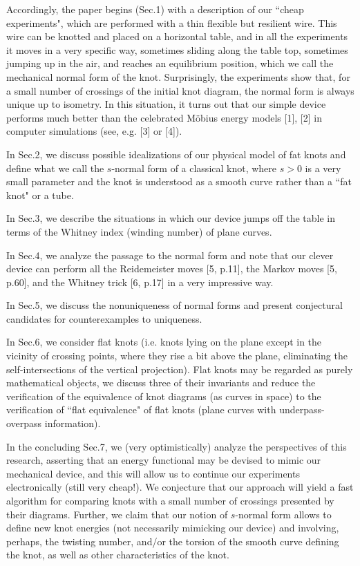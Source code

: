 \documentclass[12pt]{book}
\begin{document}
Accordingly, the paper begins (Sec.1) with a description of our ``cheap experiments", which are performed with a thin flexible but resilient wire. This wire can be knotted and placed on a horizontal table, and in all the experiments  it moves in a very specific way, sometimes sliding along the table top, sometimes jumping up in the air, and reaches an equilibrium position, which we call the mechanical normal form of the knot. Surprisingly, the experiments show that, for a small number of crossings of the initial knot diagram, the normal form is always unique up to isometry. In this situation, it turns out that our simple device performs much better than the celebrated M\"obius energy models [1], [2] in computer simulations (see, e.g. [3] or [4]).

In Sec.2, we discuss possible idealizations of our physical model of fat knots and define 
what we call the $s$-normal form of a classical knot, where $s>0$ is a very small parameter and the knot is understood as a smooth curve 
rather than a ``fat knot" or a tube. 

In Sec.3, we describe the situations in which our device jumps off the table in terms of the Whitney index (winding number) of plane curves.
 
In Sec.4, we analyze the passage to the normal form and note that our clever device can perform all the Reidemeister moves [5, p.11], the Markov moves [5, p.60], and the Whitney trick [6, p.17] in a very impressive way. 

In Sec.5, we discuss the nonuniqueness of normal forms and present conjectural candidates for counterexamples to uniqueness. 

In Sec.6, we consider flat knots (i.e. knots lying on the plane except in the vicinity of crossing points, where they rise a bit above the plane, eliminating the self-intersections 
of the vertical projection). Flat knots may be regarded as purely mathematical objects,  we discuss three of their invariants and reduce the verification of the equivalence of knot diagrams (as curves in space) to the verification of ``flat equivalence" of flat knots (plane curves with underpass-overpass information).

In the concluding Sec.7, we (very optimistically) analyze the perspectives of this research, asserting that an energy functional may be devised to mimic  our mechanical device, and this will allow us to continue our experiments electronically (still very cheap!). We conjecture that our approach will yield a fast algorithm for comparing knots with a small number of crossings presented by their diagrams. Further, we claim that our notion of  $s$-normal form allows to define new knot energies (not necessarily mimicking our device) and involving, perhaps, the twisting number, and/or the torsion of the smooth curve defining the knot, as well as other characteristics of the knot.  
\end{document}
